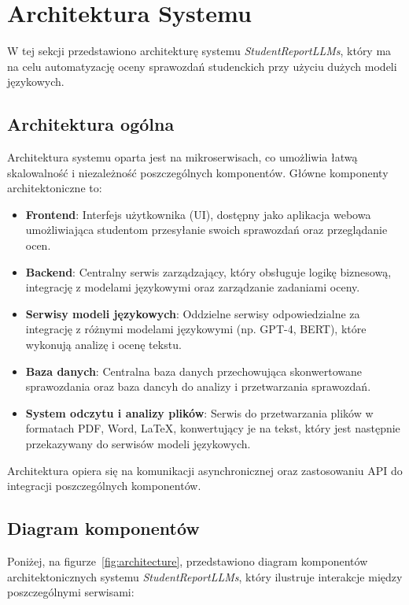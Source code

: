 \documentclass[a4paper, 12pt]{article}
\begin{document}
\section{Architektura Systemu}
W tej sekcji przedstawiono architekturę systemu \textit{StudentReportLLMs}, który ma na celu automatyzację oceny sprawozdań studenckich przy użyciu dużych modeli językowych.

\subsection{Architektura ogólna}

Architektura systemu oparta jest na mikroserwisach, co umożliwia łatwą skalowalność i niezależność poszczególnych komponentów. Główne komponenty architektoniczne to:

\begin{itemize}
    \item \textbf{Frontend}: Interfejs użytkownika (UI), dostępny jako aplikacja webowa umożliwiająca studentom przesyłanie swoich sprawozdań oraz przeglądanie ocen.
    \item \textbf{Backend}: Centralny serwis zarządzający, który obsługuje logikę biznesową, integrację z modelami językowymi oraz zarządzanie zadaniami oceny.
    \item \textbf{Serwisy modeli językowych}: Oddzielne serwisy odpowiedzialne za integrację z różnymi modelami językowymi (np. GPT-4, BERT), które wykonują analizę i ocenę tekstu.
    \item \textbf{Baza danych}: Centralna baza danych przechowująca skonwertowane sprawozdania oraz baza dancyh do analizy i przetwarzania sprawozdań.
    \item \textbf{System odczytu i analizy plików}: Serwis do przetwarzania plików w formatach PDF, Word, LaTeX, konwertujący je na tekst, który jest następnie przekazywany do serwisów modeli językowych.
\end{itemize}

Architektura opiera się na komunikacji asynchronicznej oraz zastosowaniu API do integracji poszczególnych komponentów.

\subsection*{Diagram komponentów}

Poniżej, na figurze~\ref{fig:architecture}, przedstawiono diagram komponentów architektonicznych systemu \textit{StudentReportLLMs}, który ilustruje interakcje między poszczególnymi serwisami:
\end{document}
